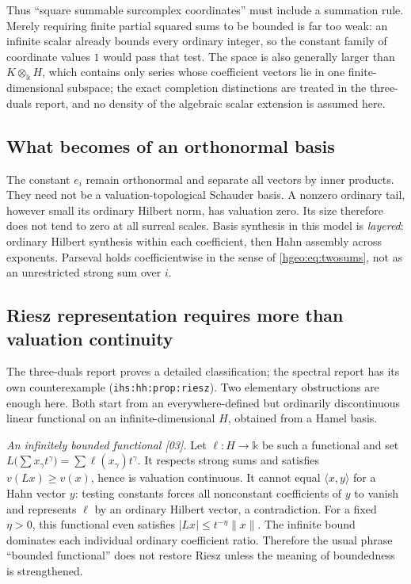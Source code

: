 \documentclass[11pt,letterpaper]{article}
\numberwithin{equation}{section}
\theoremstyle{definition}
\theoremstyle{remark}
\newcommand{\kk}{\mathbb k}
\newcommand{\K}{K}
\newcommand{\ip}[2]{\langle #1,#2\rangle}
\newcommand{\norm}[1]{\lVert #1\rVert}
\newcommand{\abs}[1]{\lvert #1\rvert}
\newcommand{\src}[1]{\textup{\textsf{\small[#1]}}}
\newcommand{\replabel}[1]{\nolinkurl{#1}}
\begin{document}
Thus ``square summable surcomplex coordinates'' must include a summation
rule. Merely requiring finite partial squared sums to be bounded is
far too weak: an infinite scalar already bounds every ordinary integer,
so the constant family of coordinate values $1$ would pass that test.
The space is also generally larger than $\K\otimes_\kk H$, which contains only
series whose coefficient vectors lie in one finite-dimensional subspace; the
exact completion distinctions are treated in the three-duals report, and no
density of the algebraic scalar extension is assumed here.

\subsection{What becomes of an orthonormal basis}
The constant $e_i$ remain orthonormal and separate all vectors by inner
products. They need not be a valuation-topological Schauder basis.
A nonzero ordinary tail, however small its ordinary Hilbert norm, has
valuation zero. Its size therefore does not tend to zero at all surreal
scales. Basis synthesis in this model is \emph{layered}: ordinary
Hilbert synthesis within each coefficient, then Hahn assembly across
exponents. Parseval holds coefficientwise in the sense of
\eqref{hgeo:eq:twosums}, not as an unrestricted strong sum over $i$.

\subsection{Riesz representation requires more than valuation continuity}
\label{hgeo:sub:riesz}
The three-duals report \cite{RepoDuals} proves a detailed classification;
the spectral report has its own counterexample
(\replabel{ihs:hh:prop:riesz}). Two elementary obstructions are enough
here. Both start from an everywhere-defined but ordinarily discontinuous
linear functional on an infinite-dimensional $H$, obtained from a Hamel
basis.

\emph{An infinitely bounded functional \src{03}.} Let $\ell:H\to\kk$ be such
a functional and set $L\bigl(\sum x_\gamma t^\gamma\bigr)=\sum\ell(x_\gamma)
t^\gamma$. It respects strong sums and satisfies $v(Lx)\ge v(x)$, hence is
valuation continuous. It cannot equal $\ip{x}{y}$ for a Hahn vector $y$:
testing constants forces all nonconstant coefficients of $y$ to vanish and
represents $\ell$ by an ordinary Hilbert vector, a contradiction. For a
fixed $\eta>0$, this functional even satisfies $\abs{Lx}\le t^{-\eta}\norm{x}$.
The infinite bound dominates each individual ordinary coefficient ratio.
Therefore the usual phrase ``bounded functional'' does not restore Riesz
unless the meaning of boundedness is strengthened.
\end{document}
